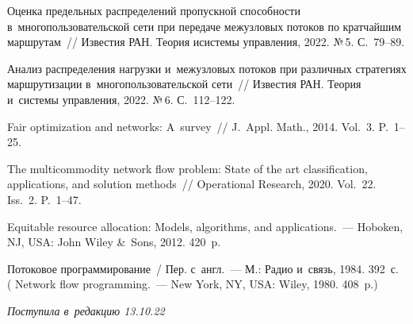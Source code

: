 \begin{multicols}{2}
{\small\frenchspacing
 {%
 \begin{thebibliography}{9}
    


Оценка предельных распределений  пропускной способности в~многопользовательской сети при  передаче  межузловых потоков  по кратчайшим  маршрутам~// 
Известия РАН. Тео\-рия и\-сис\-те\-мы управ\-ле\-ния, 2022. №\,5. С.~79--89.

Анализ распределения нагрузки и~межузловых потоков при различных стратегиях  маршрутизации  в~многопользовательской сети~// 
Известия РАН. Тео\-рия и~сис\-те\-мы управ\-ле\-ния, 2022. №\,6. С.~112--122.
    
 Fair optimization and networks: A~survey~// J.~Appl. Math., 2014. Vol.~3. P.~1--25.
    
 The multicommodity network flow problem: State of the art classification, applications, and solution methods~// 
Operational Research, 2020. Vol.~22. Iss.~2.  P.~1--47.
    
 Equitable resource allocation: Models, algorithms, and applications.~--- Hoboken, NJ, USA: John Wiley \&~Sons, 2012. 420~p.
    
 Потоковое программирование~/ Пер. с~англ.~--- М.: Радио и~связь, 1984. 392~с. 
( Network flow programming.~--- New York, NY, USA: Wiley, 1980. 408~p.)
  \end{thebibliography}

 }
 }

\end{multicols}

\vspace*{-6pt}

\hfill{\small\textit{Поступила в~редакцию 13.10.22}}



\newpage

\vspace*{-28pt}



